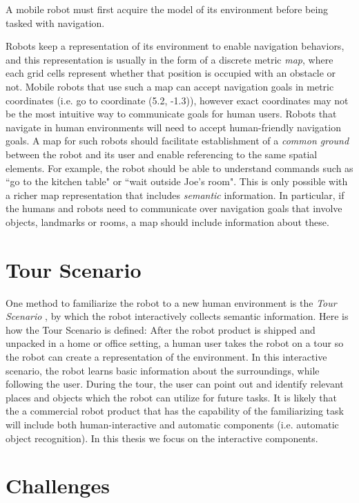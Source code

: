 A mobile robot must first acquire the model of its environment before being tasked with navigation. 

Robots keep a representation of its environment to enable navigation behaviors, and this representation is usually in the form of a discrete metric \textit{map}, where each grid cells represent whether that position is occupied with an obstacle or not. Mobile robots that use such a map can accept navigation goals in metric coordinates (i.e. go to coordinate (5.2, -1.3)), however exact coordinates may not be the most intuitive way to communicate goals for human users. Robots that navigate in human environments will need to accept human-friendly navigation goals. A map for such robots should facilitate establishment of a \textit{common ground} between the robot and its user and enable referencing to the same spatial elements. For example, the robot should be able to understand commands such as ``go to the kitchen table" or ``wait outside Joe's room". This is only possible with a richer map representation that includes \textit{semantic} information. In particular, if the humans and robots need to communicate over navigation goals that involve objects, landmarks or rooms, a map should include information about these.

\section{Tour Scenario}
\label{sec:tour_scenario}

One method to familiarize the robot to a new human environment is the \textit{Tour Scenario} \cite{topp2008human}, by which the robot interactively collects semantic information. Here is how the Tour Scenario is defined: After the robot product is shipped and unpacked in a home or office setting, a human user takes the robot on a tour so the robot can create a representation of the environment. In this interactive scenario, the robot learns basic information about the surroundings, while following the user. During the tour, the user can point out and identify relevant places and objects which the robot can utilize for future tasks. It is likely that the a commercial robot product that has the capability of the familiarizing task will include both human-interactive and automatic components (i.e. automatic object recognition). In this thesis we focus on the interactive components.



\section{Challenges}

